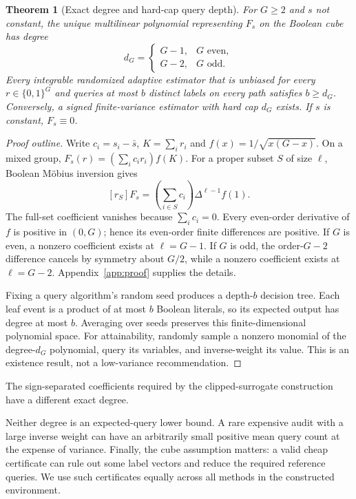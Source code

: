 \documentclass[11pt]{article}
\newtheorem{theorem}{Theorem}
\begin{document}
\begin{theorem}[Exact degree and hard-cap query depth]\label{thm:degree}
For $G\ge2$ and $s$ not constant, the unique multilinear polynomial representing $F_s$ on the Boolean cube has degree
\[
 d_G=\begin{cases}G-1,&G\text{ even},\\G-2,&G\text{ odd}.\end{cases}
\]
Every integrable randomized adaptive estimator that is unbiased for every $r\in\{0,1\}^G$ and queries at most $b$ distinct labels on every path satisfies $b\ge d_G$. Conversely, a signed finite-variance estimator with hard cap $d_G$ exists. If $s$ is constant, $F_s\equiv0$.
\end{theorem}
\begin{proof}[Proof outline]
Write $c_i=s_i-\bar s$, $K=\sum_i r_i$ and $f(x)=1/\sqrt{x(G-x)}$. On a mixed group, $F_s(r)=(\sum_i c_i r_i)f(K)$. For a proper subset $S$ of size $\ell$, Boolean M\"obius inversion gives
\begin{equation}\label{eq:mobius}
 [r_S]F_s=\left(\sum_{i\in S}c_i\right)\Delta^{\ell-1}f(1).
\end{equation}
The full-set coefficient vanishes because $\sum_i c_i=0$. Every even-order derivative of $f$ is positive in $(0,G)$; hence its even-order finite differences are positive. If $G$ is even, a nonzero coefficient exists at $\ell=G-1$. If $G$ is odd, the order-$G-2$ difference cancels by symmetry about $G/2$, while a nonzero coefficient exists at $\ell=G-2$. Appendix~\ref{app:proof} supplies the details.

Fixing a query algorithm's random seed produces a depth-$b$ decision tree. Each leaf event is a product of at most $b$ Boolean literals, so its expected output has degree at most $b$. Averaging over seeds preserves this finite-dimensional polynomial space. For attainability, randomly sample a nonzero monomial of the degree-$d_G$ polynomial, query its variables, and inverse-weight its value. This is an existence result, not a low-variance recommendation.
\end{proof}

The sign-separated coefficients required by the clipped-surrogate construction have a different exact degree.

Neither degree is an expected-query lower bound. A rare expensive audit with a large inverse weight can have an arbitrarily small positive mean query count at the expense of variance. Finally, the cube assumption matters: a valid cheap certificate can rule out some label vectors and reduce the required reference queries. We use such certificates equally across all methods in the constructed environment.
\end{document}
